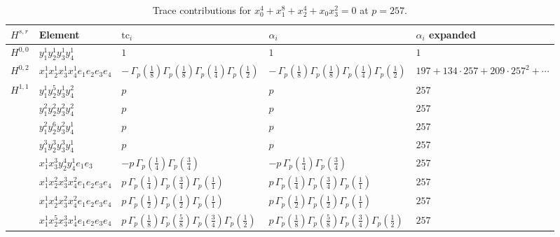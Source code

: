 \documentclass[11pt]{article}
\begin{document}
\begin{table}[ht]
\centering
\caption{Trace contributions for $x_0^{4} + x_1^{8} + x_2^{4} + x_0 x_3^{2} = 0$ at $p=257$.}\label{tab:deformed-12}
\renewcommand{\arraystretch}{1.1}
{\scriptsize
\begin{tabular}{@{}lllll@{}}
\toprule
$H^{s,r}$ & Element & $\mathrm{tc}_i$ & $\alpha_i$ & $\alpha_i$ expanded \\
\midrule
$H^{0,0}$ & $y_{1}^{1} y_{2}^{1} y_{3}^{1} y_{4}^{1}$ & $1$ & $1$ & $1$ \\
\midrule
$H^{0,2}$ & $x_{1}^{1} x_{2}^{1} x_{3}^{1} x_{4}^{1}  e_{1} e_{2} e_{3} e_{4}$ & $- \, \Gamma_p \left( \frac{1}{8} \right) \Gamma_p \left( \frac{1}{8} \right) \Gamma_p \left( \frac{1}{4} \right) \Gamma_p \left( \frac{1}{2} \right)$ & $- \, \Gamma_p \left( \frac{1}{8} \right) \Gamma_p \left( \frac{1}{8} \right) \Gamma_p \left( \frac{1}{4} \right) \Gamma_p \left( \frac{1}{2} \right)$ & $197{+}134{\cdot}257{+}209{\cdot}257^{2}{+}\cdots$ \\
\midrule
$H^{1,1}$ & $y_{1}^{1} y_{2}^{5} y_{3}^{1} y_{4}^{2}$ & $p \,$ & $p \,$ & $257$ \\
 & $y_{1}^{2} y_{2}^{2} y_{3}^{2} y_{4}^{2}$ & $p \,$ & $p \,$ & $257$ \\
 & $y_{1}^{2} y_{2}^{6} y_{3}^{2} y_{4}^{1}$ & $p \,$ & $p \,$ & $257$ \\
 & $y_{1}^{3} y_{2}^{3} y_{3}^{3} y_{4}^{1}$ & $p \,$ & $p \,$ & $257$ \\
 & $x_{1}^{1} x_{3}^{3} y_{2}^{4} y_{4}^{1} e_{1} e_{3}$ & $- p \, \Gamma_p \left( \frac{1}{4} \right) \Gamma_p \left( \frac{3}{4} \right)$ & $- p \, \Gamma_p \left( \frac{1}{4} \right) \Gamma_p \left( \frac{3}{4} \right)$ & $257$ \\
 & $x_{1}^{1} x_{2}^{2} x_{3}^{3} x_{4}^{2}  e_{1} e_{2} e_{3} e_{4}$ & $p \, \Gamma_p \left( \frac{1}{4} \right) \Gamma_p \left( \frac{3}{4} \right) \Gamma_p \left( \frac{1}{1} \right)$ & $p \, \Gamma_p \left( \frac{1}{4} \right) \Gamma_p \left( \frac{3}{4} \right) \Gamma_p \left( \frac{1}{1} \right)$ & $257$ \\
 & $x_{1}^{1} x_{2}^{4} x_{3}^{2} x_{4}^{2}  e_{1} e_{2} e_{3} e_{4}$ & $p \, \Gamma_p \left( \frac{1}{2} \right) \Gamma_p \left( \frac{1}{2} \right) \Gamma_p \left( \frac{1}{1} \right)$ & $p \, \Gamma_p \left( \frac{1}{2} \right) \Gamma_p \left( \frac{1}{2} \right) \Gamma_p \left( \frac{1}{1} \right)$ & $257$ \\
 & $x_{1}^{1} x_{2}^{5} x_{3}^{3} x_{4}^{1}  e_{1} e_{2} e_{3} e_{4}$ & $p \, \Gamma_p \left( \frac{1}{8} \right) \Gamma_p \left( \frac{5}{8} \right) \Gamma_p \left( \frac{3}{4} \right) \Gamma_p \left( \frac{1}{2} \right)$ & $p \, \Gamma_p \left( \frac{1}{8} \right) \Gamma_p \left( \frac{5}{8} \right) \Gamma_p \left( \frac{3}{4} \right) \Gamma_p \left( \frac{1}{2} \right)$ & $257$ \\

\end{tabular}}
\end{table}
\end{document}
